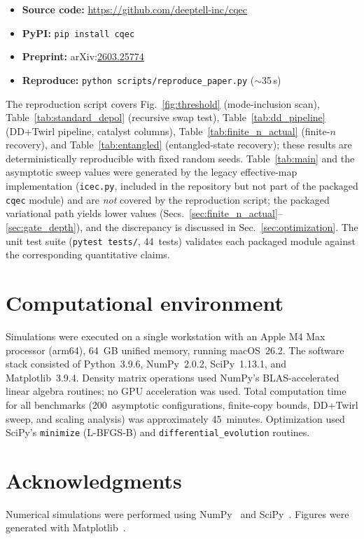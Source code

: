 \documentclass[a4paper,twocolumn]{quantumarticle}
\begin{document}
\begin{itemize}
\item \textbf{Source code:} \url{https://github.com/deeptell-inc/cqec}
\item \textbf{PyPI:} \texttt{pip\,install\,cqec}
\item \textbf{Preprint:} arXiv:\href{https://doi.org/10.48550/arXiv.2603.25774}{2603.25774}
\item \textbf{Reproduce:} \texttt{python\,scripts/}\allowbreak\texttt{reproduce\_paper.py} ($\sim$35\,s)
\end{itemize}

The reproduction script covers Fig.~\ref{fig:threshold} (mode-inclusion scan), Table~\ref{tab:standard_depol} (recursive swap test), Table~\ref{tab:dd_pipeline} (DD+Twirl pipeline, catalyst columns), Table~\ref{tab:finite_n_actual} (finite-$n$ recovery), and Table~\ref{tab:entangled} (entangled-state recovery); these results are deterministically reproducible with fixed random seeds.
Table~\ref{tab:main} and the asymptotic sweep values were generated by the legacy effective-map implementation (\texttt{icec.py}, included in the repository but not part of the packaged \texttt{cqec} module) and are \emph{not} covered by the reproduction script; the packaged variational path yields lower values (Secs.~\ref{sec:finite_n_actual}--\ref{sec:gate_depth}), and the discrepancy is discussed in Sec.~\ref{sec:optimization}.
The unit test suite (\texttt{pytest tests/}, 44~tests) validates each packaged module against the corresponding quantitative claims.


\section*{Computational environment}

Simulations were executed on a single workstation with an Apple M4 Max processor (arm64), 64~GB unified memory, running macOS~26.2.
The software stack consisted of Python~3.9.6, NumPy~2.0.2, SciPy~1.13.1, and Matplotlib~3.9.4.
Density matrix operations used NumPy's BLAS-accelerated linear algebra routines; no GPU acceleration was used.
Total computation time for all benchmarks (200~asymptotic configurations, finite-copy bounds, DD+Twirl sweep, and scaling analysis) was approximately 45~minutes.
Optimization used SciPy's \texttt{minimize} (L-BFGS-B) and \texttt{differential\allowbreak\_evolution} routines.


\section*{Acknowledgments}

Numerical simulations were performed using NumPy~\cite{numpy2020} and SciPy~\cite{scipy2020}.
Figures were generated with Matplotlib~\cite{Hunter2007}.




\end{document}
